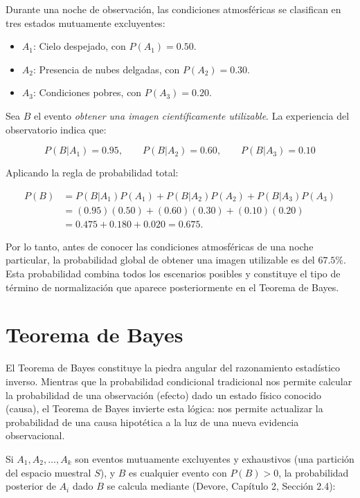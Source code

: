 Durante una noche de observación, las condiciones atmosféricas se clasifican en tres estados mutuamente excluyentes:

\begin{itemize}
    \item $A_1$: Cielo despejado, con $P(A_1)=0.50$.
    \item $A_2$: Presencia de nubes delgadas, con $P(A_2)=0.30$.
    \item $A_3$: Condiciones pobres, con $P(A_3)=0.20$.
\end{itemize}

Sea $B$ el evento \textit{obtener una imagen científicamente utilizable}. La experiencia del observatorio indica que:

$$ P(B|A_1)=0.95,\qquad P(B|A_2)=0.60,\qquad P(B|A_3)=0.10 $$

Aplicando la regla de probabilidad total:

\begin{align*}
P(B) &= P(B|A_1)P(A_1)+P(B|A_2)P(A_2)+P(B|A_3)P(A_3)\\
     &= (0.95)(0.50)+(0.60)(0.30)+(0.10)(0.20)\\
     &= 0.475+0.180+0.020=0.675.
\end{align*}

Por lo tanto, antes de conocer las condiciones atmosféricas de una noche particular, la probabilidad global de obtener una imagen utilizable es del $67.5\%$. Esta probabilidad combina todos los escenarios posibles y constituye el tipo de término de normalización que aparece posteriormente en el Teorema de Bayes.

\section{Teorema de Bayes}

El Teorema de Bayes constituye la piedra angular del razonamiento estadístico inverso. Mientras que la probabilidad condicional tradicional nos permite calcular la probabilidad de una observación (efecto) dado un estado físico conocido (causa), el Teorema de Bayes invierte esta lógica: nos permite actualizar la probabilidad de una causa hipotética a la luz de una nueva evidencia observacional. 

Si $A_1, A_2, \dots, A_k$ son eventos mutuamente excluyentes y exhaustivos (una partición del espacio muestral $S$), y $B$ es cualquier evento con $P(B) > 0$, la probabilidad posterior de $A_i$ dado $B$ se calcula mediante (Devore, Capítulo 2, Sección 2.4):

